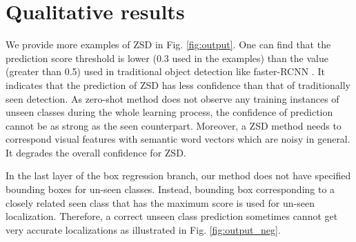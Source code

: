 \documentclass[runningheads]{llncs}
\begin{document}
 \begin{table}[!t]
  \begin{center}
  \end{center}
\caption{Comparison of seen and unseen class performance using ResNet as convolution layers. word2vec is used for baseline, our () and our (). Best performance in each row are shown as bold. We refer Unseen (all): mAP of all unseen classes, Unseen (selected): mAP of selected classes for which visually similar classes are present.}
  \label{tab:seenresult}
\end{table}

\section{Qualitative results} \label{sec:qualitative}

We provide more examples of ZSD in Fig. \ref{fig:output}. One can find that the prediction score threshold is lower (0.3 used in the examples) than the value (greater than 0.5) used in traditional object detection like faster-RCNN \cite{Faster_RCNN_2017}. It indicates that the prediction of ZSD has less confidence than that of traditionally seen detection. As zero-shot method does not observe any training instances of unseen classes during the whole learning process, the confidence of prediction cannot be as strong as the seen counterpart. Moreover, a ZSD method needs to correspond visual features with semantic word vectors which are noisy in general. It degrades the overall confidence for ZSD.

In the last layer of the box regression branch, our method does not have specified bounding boxes for un-seen classes. Instead, bounding box corresponding to a closely related seen class that has the maximum score is used for un-seen localization. Therefore, a correct unseen class prediction sometimes cannot get very accurate localizations as illustrated in Fig. \ref{fig:output_neg}.
\end{document}
